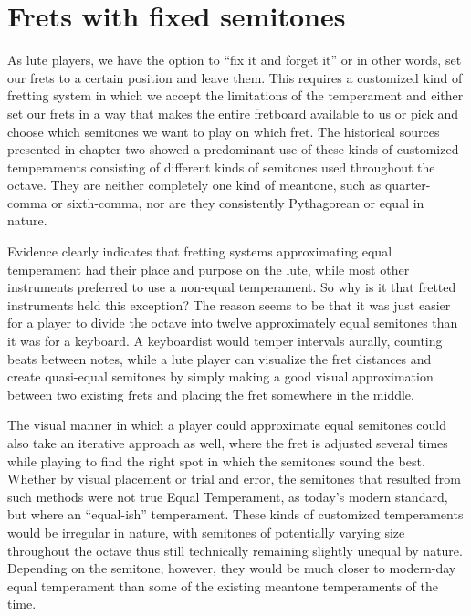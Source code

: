 \section{Frets with fixed semitones}

As lute players, we have the option to ``fix it and forget it'' or in other words, set
our frets to a certain position and leave them. This requires a customized kind of
fretting system in which we accept the limitations of the temperament and either set
our frets in a way that makes the entire fretboard available to us or pick and choose
which semitones we want to play on which fret. The historical sources presented in
chapter two showed a predominant use of these kinds of customized temperaments
consisting of different kinds of semitones used throughout the octave. They are neither
completely one kind of meantone, such as quarter-comma or sixth-comma, nor are they
consistently Pythagorean or equal in nature.

Evidence clearly indicates that fretting systems approximating equal temperament had
their place and purpose on the lute, while most other instruments preferred to use a
non-equal temperament.  So why is it that fretted instruments held this exception? The
reason seems to be that it was just easier for a player to divide the octave into
twelve approximately equal semitones than it was for a keyboard. A keyboardist would
temper intervals aurally, counting beats between notes, while a lute player can
visualize the fret distances and create quasi-equal semitones by simply making a good
visual approximation between two existing frets and placing the fret somewhere in the
middle.

The visual manner in which a player could approximate equal semitones could also take
an iterative approach as well, where the fret is adjusted several times while playing
to find the right spot in which the semitones sound the best. Whether by visual
placement or trial and error, the semitones that resulted from such methods were not
true Equal Temperament, as today's modern standard, but where an ``equal-ish''
temperament. These kinds of customized temperaments would be irregular in nature, with
semitones of potentially varying size throughout the octave thus still technically
remaining slightly unequal by nature. Depending on the semitone, however, they would be
much closer to modern-day equal temperament than some of the existing meantone
temperaments of the time.

